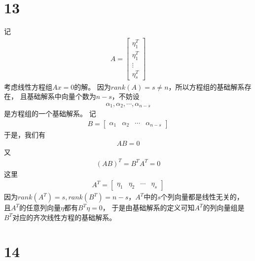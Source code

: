 \documentclass{article}
\begin{document}
\section*{13}

记
\begin{align*}
  A = \begin{bmatrix}
        \eta_1^T \\
        \eta_1^T \\
        \vdots   \\
        \eta_s^T
      \end{bmatrix}
\end{align*}
考虑线性方程组$Ax = 0$的解。
因为$rank(A) = s \neq n$，所以方程组的基础解系存在，
且基础解系中向量个数为$n - s$，不妨设
\begin{align*}
  \alpha_1, \alpha_2, \cdots, \alpha_{n - s}
\end{align*}
是方程组的一个基础解系。
记
\begin{align*}
  B = \begin{bmatrix}
        \alpha_1 & \alpha_2 & \cdots & \alpha_{n - s}
      \end{bmatrix}
\end{align*}
于是，我们有
\begin{align*}
  A B = 0
\end{align*}
又
\begin{align*}
  (AB)^T = B^T A^T = 0
\end{align*}
这里
\begin{align*}
  A^T = \begin{bmatrix}
          \eta_1 & \eta_2 & \cdots & \eta_s
        \end{bmatrix}
\end{align*}
因为$rank(A^T) = s, rank(B^T) = n - s$，$A^T$中的$s$个列向量都是线性无关的，
且$A^T$的任意列向量$\eta$都有$B^T \eta = 0$，
于是由基础解系的定义可知$A^T$的列向量组是$B^T$对应的齐次线性方程的基础解系。

\section*{14}
\end{document}

